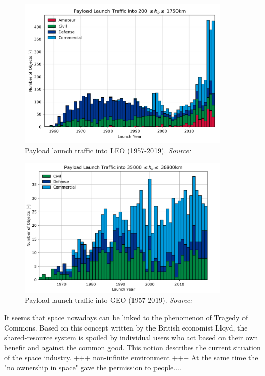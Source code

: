 \begin{figure}
\centering
\includegraphics[width=0.9\textwidth]{Images/launch_traffic_LEO.png}\caption{Payload launch traffic into LEO (1957-2019). \textit{Source: \cite{ESA 2019}}}
\label{launch_traffic} 
\end{figure}

\begin{figure}
\centering
\includegraphics[width=0.9\textwidth]{Images/launch_traffic_GEO.png}\caption{Payload launch traffic into GEO (1957-2019). \textit{Source: \cite{ESA 2019}}}
\label{launch_traffic} 
\end{figure}



It seems that space nowadays can be linked to the phenomenon of Tragedy of Commons. Based on this concept written by the British economist Lloyd, the shared-resource system is spoiled by individual users who act based on their own benefit and against the common good. This notion describes the current situation of the space industry. +++ non-infinite environment +++ At the same time the "no ownership in space" gave the permission to people....

